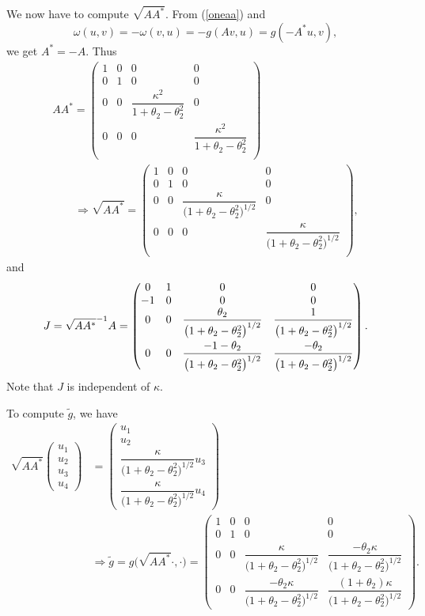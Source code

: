 \documentclass[10pt,a4paper]{amsart}
\numberwithin{equation}{section}
\theoremstyle{definition}
\newcommand{\tg}{\tilde g}
\begin{document}
We now have to compute $\sqrt{AA^*}$. From (\ref{oneaa}) and
\[\omega(u,v) = -\omega(v,u) = -g(Av,u) = g(-A^*u,v),\]
we get $A^* = -A$. Thus
\begin{gather*}
AA^* =
\begin{pmatrix} 1&0&0&0\\ 0&1&0&0\\
0&0& \dfrac{\kappa^2}{1+\theta_2-\theta_2^2}&0\\
0&0&0&\dfrac{\kappa^2}{1+\theta_2-\theta_2^2}\\
\end{pmatrix}\\
\qquad
\Longrightarrow \sqrt{AA^*} =
 \begin{pmatrix}1&0&0&0\\ 0&1&0&0\\
0&0& \dfrac{\kappa}{\bigl(1+\theta_2-\theta_2^2\bigr)^{1/2}}&0\\
0&0&0&\dfrac{\kappa}{\bigl(1+\theta_2-\theta_2^2\bigr)^{1/2}}\\
\end{pmatrix},
\end{gather*}
and{\samepage
\begin{equation*}%
J = \sqrt{AA^*}^{-1}A =
\begin{pmatrix} 0&1&0&0\\
-1&0&0&0\\
0&0& \dfrac{\theta_2}{\bigl(1+\theta_2-\theta_2^2\bigr)^{1/2}}& \dfrac{1}{\bigl(1+\theta_2-\theta_2^2\bigr)^{1/2}}\vspace{1mm}\\
0&0&\dfrac{-1-\theta_2}{\bigl(1+\theta_2-\theta_2^2\bigl)^{1/2}}&\dfrac{-\theta_2}{\bigl(1+\theta_2-\theta_2^2\bigr)^{1/2}}
\end{pmatrix}.
\end{equation*}
Note that $J$ is independent of $\kappa$.}

To compute $\tg$, we have
\begin{align*}%
\sqrt{AA^*}\begin{pmatrix} u_1\\u_2\\u_3\\u_4\end{pmatrix} &= \begin{pmatrix} u_1\\u_2\\
\dfrac{\kappa}{\bigl(1+\theta_2-\theta_2^2\bigr)^{1/2}}u_3 \\
\dfrac{\kappa}{\bigl(1+\theta_2-\theta_2^2\bigr)^{1/2}}u_4
\end{pmatrix} \\
&\Longrightarrow \tg = g\bigl(\sqrt{AA^*}\cdot,\cdot\bigr) = \begin{pmatrix} 1&0&0&0\\
0&1&0&0\\
0&0& \dfrac{\kappa}{\bigl(1+\theta_2-\theta_2^2\bigr)^{1/2}}& \dfrac{-\theta_2\kappa}{\bigl(1+\theta_2-\theta_2^2\bigr)^{1/2}}\\[2mm]
0&0&\dfrac{-\theta_2\kappa}{\bigl(1+\theta_2-\theta_2^2\bigr)^{1/2}}& \dfrac{(1+\theta_2)\kappa}{\bigl(1+\theta_2-\theta_2^2\bigr)^{1/2}}
\end{pmatrix}.
\end{align*}
\end{document}
